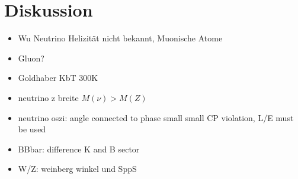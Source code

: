 \section{Diskussion}
\begin{itemize}
	\item Wu Neutrino Helizität nicht bekannt, Muonische Atome
	\item Gluon?
	\item Goldhaber KbT 300K
	\item neutrino z breite $M(\nu) > M(Z)$
	\item neutrino oszi: angle connected to phase small small CP violation, L/E must be used
	\item BBbar: difference K and B sector
	\item W/Z: weinberg winkel und SppS

\end{itemize}
